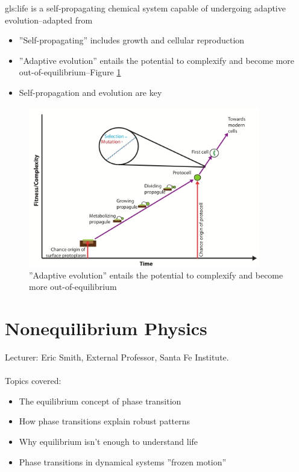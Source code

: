 \documentclass[]{article}
\begin{document}
\gls{gls:life} is a self-propagating chemical system capable of undergoing adaptive evolution--adapted from \cite{deamer1994origins}
\begin{itemize}
	\item ''Self-propagating'' includes growth and cellular reproduction 
	\item ''Adaptive evolution'' entails the potential to complexify and become more out-of-equilibrium--Figure \ref{fig:AdaptiveEvolution}
	\item Self-propagation and evolution are key
\end{itemize}

\begin{figure}[H]
	\caption{''Adaptive evolution'' entails the potential to complexify and become more out-of-equilibrium}\label{fig:AdaptiveEvolution} 
	\includegraphics[width=0.9\textwidth]{AdaptiveEvolution}
\end{figure}



\section{Nonequilibrium Physics}

Lecturer: Eric Smith, External Professor, Santa Fe Institute.\\
\\
Topics covered:
\begin{itemize}
	\item The equilibrium concept of phase transition
	
	\item How phase transitions explain robust patterns
	
	\item Why equilibrium isn’t enough to understand life
	\item Phase transitions in dynamical systems ''frozen motion''
\end{itemize}
\end{document}
